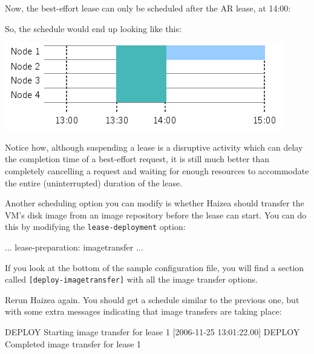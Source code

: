Now, the best-effort lease can only be scheduled after the AR lease, at 14:00:


So, the schedule would end up looking like this:

\begin{center}
\includegraphics{images/quickstart_leasegraph4.png}
\end{center}

Notice how, although suspending a lease is a disruptive activity which can delay the completion time of a best-effort request, it is still much better than completely cancelling a request and waiting for enough resources to accommodate the entire (uninterrupted) duration of the lease.

Another scheduling option you can modify is whether Haizea should transfer the VM's disk image from an image repository before the lease can start. You can do this by modifying the \texttt{lease-deployment} option:

\begin{wideshellverbatim}
[general]
...
lease-preparation: imagetransfer
...
\end{wideshellverbatim}

If you look at the bottom of the sample configuration file, you will find a section called \texttt{[deploy-imagetransfer]} with all the image transfer options.

Rerun Haizea again. You should get a schedule similar to the previous one, but with some extra messages indicating that image transfers are taking place:

\begin{wideshellverbatim}
[2006-11-25 13:00:00.00] DEPLOY  Starting image transfer for lease 1
[2006-11-25 13:01:22.00] DEPLOY  Completed image transfer for lease 1
\end{wideshellverbatim}

